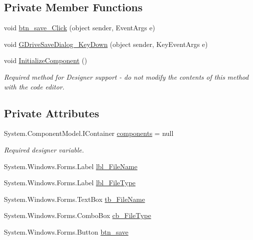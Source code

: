 \subsection*{Private Member Functions}
\begin{DoxyCompactItemize}
\item 
void \mbox{\hyperlink{class_paint___program_1_1_g_drive_save_dialog_a959f7a3b69241eb437b9f1a4fb85a78a}{btn\+\_\+save\+\_\+\+Click}} (object sender, Event\+Args e)
\item 
void \mbox{\hyperlink{class_paint___program_1_1_g_drive_save_dialog_ac5899bc01a3c230e5f584b4935e69bb6}{G\+Drive\+Save\+Dialog\+\_\+\+Key\+Down}} (object sender, Key\+Event\+Args e)
\item 
void \mbox{\hyperlink{class_paint___program_1_1_g_drive_save_dialog_af1ddb499fb44b4855723e4049430737a}{Initialize\+Component}} ()
\begin{DoxyCompactList}\small\item\em Required method for Designer support -\/ do not modify the contents of this method with the code editor. \end{DoxyCompactList}\end{DoxyCompactItemize}
\subsection*{Private Attributes}
\begin{DoxyCompactItemize}
\item 
System.\+Component\+Model.\+I\+Container \mbox{\hyperlink{class_paint___program_1_1_g_drive_save_dialog_a24fad5d02f8aabbc1c4cb44c589ea996}{components}} = null
\begin{DoxyCompactList}\small\item\em Required designer variable. \end{DoxyCompactList}\item 
System.\+Windows.\+Forms.\+Label \mbox{\hyperlink{class_paint___program_1_1_g_drive_save_dialog_a9e41e2aba62a97ccb2f503a292ba326b}{lbl\+\_\+\+File\+Name}}
\item 
System.\+Windows.\+Forms.\+Label \mbox{\hyperlink{class_paint___program_1_1_g_drive_save_dialog_a0246d2725477aee356db78f9310427dc}{lbl\+\_\+\+File\+Type}}
\item 
System.\+Windows.\+Forms.\+Text\+Box \mbox{\hyperlink{class_paint___program_1_1_g_drive_save_dialog_af9552fce325d995ecc4dc516416ea0d8}{tb\+\_\+\+File\+Name}}
\item 
System.\+Windows.\+Forms.\+Combo\+Box \mbox{\hyperlink{class_paint___program_1_1_g_drive_save_dialog_afb22d3b716cb3461399dbe7c6ac4b04c}{cb\+\_\+\+File\+Type}}
\item 
System.\+Windows.\+Forms.\+Button \mbox{\hyperlink{class_paint___program_1_1_g_drive_save_dialog_ac358c621a7f3820fd1298d40bbf581fe}{btn\+\_\+save}}
\end{DoxyCompactItemize}


